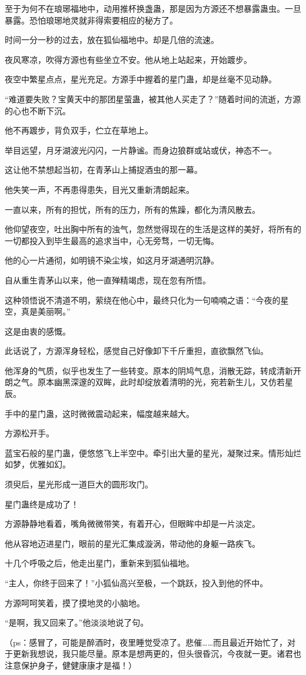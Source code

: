 \begin{this_body}
至于为何不在琅琊福地中，动用推杯换盏蛊，那是因为方源还不想暴露蛊虫。一旦暴露。恐怕琅琊地灵就非得索要相应的秘方了。

时间一分一秒的过去，放在狐仙福地中。却是几倍的流速。

夜风寒凉，吹得方源也有些坐立不安。他从地上站起来，开始踱步。

夜空中繁星点点，星光充足。方源手中握着的星门蛊，却是丝毫不见动静。

“难道要失败？宝黄天中的那团星萤蛊，被其他人买走了？”随着时间的流逝，方源的心也不断下沉。

他不再踱步，背负双手，伫立在草地上。

举目远望，月牙湖波光闪闪，一片静谧。而身边狼群或站或伏，神态不一。

这让他不禁想起当初，在青茅山上捕捉酒虫的那一幕。

他失笑一声，不再患得患失，目光又重新清朗起来。

一直以来，所有的担忧，所有的压力，所有的焦躁，都化为清风散去。

他仰望夜空，吐出胸中所有的浊气，忽然觉得现在的生活是这样的美好，将所有的一切都投入到毕生最高的追求当中，心无旁骛，一切无悔。

他的心一片通彻，如明镜不染尘埃，如这月牙湖通明沉静。

自从重生青茅山以来，他一直殚精竭虑，现在忽有所悟。

这种领悟说不清道不明，萦绕在他心中，最终只化为一句喃喃之语：“今夜的星空，真是美丽啊。”

这是由衷的感慨。

此话说了，方源浑身轻松，感觉自己好像卸下千斤重担，直欲飘然飞仙。

他浑身的气质，似乎也发生了一些转变。原本的阴鸠气息，消散无踪，转成清新开朗之气。原本幽黑深邃的双眸，此时却绽放着清明的光，宛若新生儿，又仿若星辰。

手中的星门蛊，这时微微震动起来，幅度越来越大。

方源松开手。

蓝宝石般的星门蛊，便悠悠飞上半空中。牵引出大量的星光，凝聚过来。情形灿烂如梦，优雅如幻。

须臾后，星光形成一道巨大的圆形攻门。

星门蛊终是成功了！

方源静静地看着，嘴角微微带笑，有着开心，但眼眸中却是一片淡定。

他从容地迈进星门，眼前的星光汇集成漩涡，带动他的身躯一路疾飞。

十几个呼吸之后，他走出星门，重新来到狐仙福地。

“主人，你终于回来了！”小狐仙高兴至极，一个跳跃，投入到他的怀中。

方源呵呵笑着，摸了摸地灵的小脑地。

“是啊，我又回来了。”他淡淡地说了句。

（ps：感冒了，可能是醉酒时，夜里睡觉受凉了。悲催……而且最近开始忙了，对于更新我想说，我只能尽量。原本是想两更的，但头很昏沉，今夜就一更。诸君也注意保护身子，健健康康才是福！）

\end{this_body}


